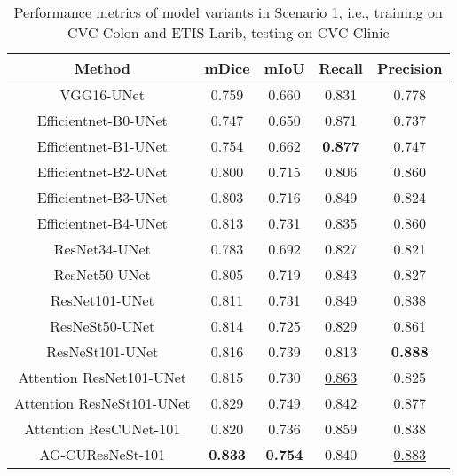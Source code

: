 \documentclass[review, sort&compress]{elsarticle}
\begin{document}
\begin{table}[ht!]
\centering
\caption{Performance metrics of model variants in Scenario 1, i.e., training on CVC-Colon and ETIS-Larib, testing on CVC-Clinic}
\begin{tabular}{ c | c c c c}
\hline
Method & mDice       & mIoU    & Recall          & Precision        \\
\hline
\hline
VGG16-UNet & 0.759 &    0.660 & 0.831 & 0.778 \\
Efficientnet-B0-UNet &  0.747 & 0.650 & 0.871 & 0.737 \\
Efficientnet-B1-UNet &  0.754 & 0.662 & \textbf{0.877} &    0.747 \\
Efficientnet-B2-UNet &  0.800 & 0.715 & 0.806 & 0.860 \\
Efficientnet-B3-UNet &  0.803 & 0.716 & 0.849 & 0.824 \\
Efficientnet-B4-UNet &  0.813 & 0.731 & 0.835 & 0.860 \\
\hline
\hline
ResNet34-UNet                  & 0.783          & 0.692          & 0.827          & 0.821           \\
ResNet50-UNet                  & 0.805          & 0.719          & 0.843          & 0.827           \\
ResNet101-UNet                 & 0.811          & 0.731          & 0.849          & 0.838           \\
ResNeSt50-UNet                 & 0.814          & 0.725          & 0.829          & 0.861           \\
ResNeSt101-UNet                & 0.816          & 0.739          & 0.813          & \textbf{0.888}           \\
\hline
\hline
Attention ResNet101-UNet          & 0.815          & 0.730          & \underline{0.863}          & 0.825           \\
Attention ResNeSt101-UNet       & \underline{0.829}          & \underline{0.749}          & 0.842          & 0.877           \\
\hline
\hline
Attention ResCUNet-101          & 0.820          & 0.736          & 0.859          & 0.838           \\
AG-CUResNeSt-101 & \textbf{0.833} & \textbf{0.754} & 0.840 & \underline{0.883}  \\
\hline
\end{tabular}
\label{tab_colon_etis_clinic}
\end{table}
\end{document}

